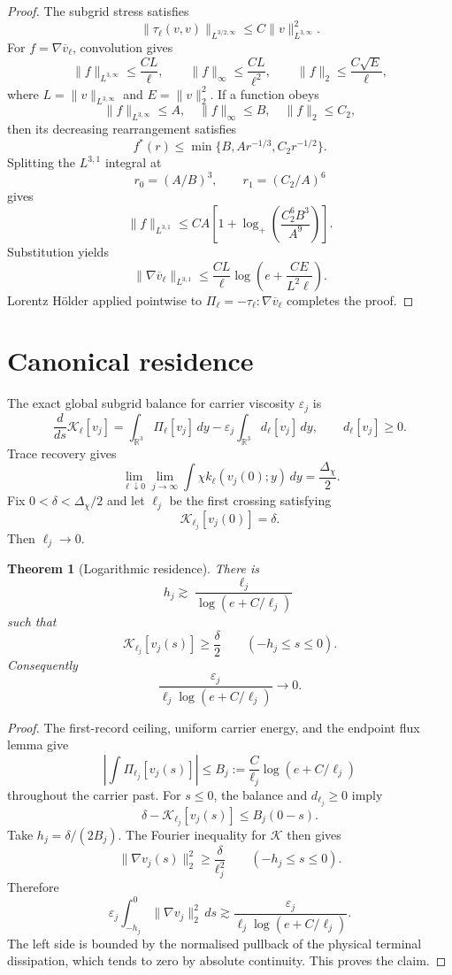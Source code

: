 \documentclass[11pt]{article}
\newtheorem{theorem}{Theorem}
\theoremstyle{definition}
\theoremstyle{remark}
\newcommand{\R}{\mathbb{R}}
\newcommand{\cK}{\mathcal{K}}
\newcommand{\eps}{\varepsilon}
\newcommand{\Lweak}{L^{3,\infty}}
\begin{document}
\begin{proof}
The subgrid stress satisfies
\[
 \|\tau_\ell(v,v)\|_{L^{3/2,\infty}}
 \le C\|v\|_{\Lweak}^2.
\]
For \(f=\nabla\overline v_\ell\), convolution gives
\[
 \|f\|_{L^{3,\infty}}\le\frac{CL}{\ell},
 \qquad
 \|f\|_\infty\le\frac{CL}{\ell^2},
 \qquad
 \|f\|_2\le\frac{C\sqrt E}{\ell},
\]
where \(L=\|v\|_{\Lweak}\) and \(E=\|v\|_2^2\).
If a function obeys
\[
 \|f\|_{L^{3,\infty}}\le A,\quad
 \|f\|_\infty\le B,\quad
 \|f\|_2\le C_2,
\]
then its decreasing rearrangement satisfies
\[
 f^*(r)\le\min\{B,Ar^{-1/3},C_2r^{-1/2}\}.
\]
Splitting the \(L^{3,1}\) integral at
\[
 r_0=(A/B)^3,\qquad r_1=(C_2/A)^6
\]
gives
\[
 \|f\|_{L^{3,1}}
 \le CA\left[
 1+\log_+\!\left(\frac{C_2^6B^3}{A^9}\right)
 \right].
\]
Substitution yields
\[
 \|\nabla\overline v_\ell\|_{L^{3,1}}
 \le
 \frac{CL}{\ell}\log\!\left(e+\frac{CE}{L^2\ell}\right).
\]
Lorentz H\"older applied pointwise to
\(\Pi_\ell=-\tau_\ell:\nabla\overline v_\ell\) completes the proof.
\end{proof}

\section{Canonical residence}

The exact global subgrid balance for carrier viscosity \(\eps_j\) is
\[
 \frac{d}{ds}\cK_\ell[v_j]
 =
 \int_{\R^3}\Pi_\ell[v_j]\,dy
 -
 \eps_j\int_{\R^3}d_\ell[v_j]\,dy,
 \qquad d_\ell[v_j]\ge0.
\]
Trace recovery gives
\[
 \lim_{\ell\downarrow0}\lim_{j\to\infty}
 \int\chi k_\ell(v_j(0);y)\,dy
 =\frac{\Delta_\chi}{2}.
\]
Fix \(0<\delta<\Delta_\chi/2\) and let \(\ell_j\) be the first
crossing satisfying
\[
 \cK_{\ell_j}[v_j(0)]=\delta.
\]
Then \(\ell_j\to0\).

\begin{theorem}[Logarithmic residence]
There is
\[
 h_j\gtrsim\frac{\ell_j}{\log(e+C/\ell_j)}
\]
such that
\[
 \cK_{\ell_j}[v_j(s)]\ge\frac{\delta}{2}
 \qquad(-h_j\le s\le0).
\]
Consequently
\[
 \frac{\eps_j}{\ell_j\log(e+C/\ell_j)}\longrightarrow0.
\]
\end{theorem}

\begin{proof}
The first-record ceiling, uniform carrier energy, and the endpoint flux lemma
give
\[
 \left|\int\Pi_{\ell_j}[v_j(s)]\right|
 \le
 B_j:=
 \frac{C}{\ell_j}\log(e+C/\ell_j)
\]
throughout the carrier past.  For \(s\le0\), the balance and
\(d_{\ell_j}\ge0\) imply
\[
 \delta-\cK_{\ell_j}[v_j(s)]
 \le B_j(0-s).
\]
Take \(h_j=\delta/(2B_j)\).  The Fourier inequality for \(\cK\) then gives
\[
 \|\nabla v_j(s)\|_2^2
 \ge\frac{\delta}{\ell_j^2}
 \qquad(-h_j\le s\le0).
\]
Therefore
\[
 \eps_j\int_{-h_j}^0\|\nabla v_j\|_2^2\,ds
 \gtrsim
 \frac{\eps_j}{\ell_j\log(e+C/\ell_j)}.
\]
The left side is bounded by the normalised pullback of the physical terminal
dissipation, which tends to zero by absolute continuity.  This proves the
claim.
\end{proof}
\end{document}
